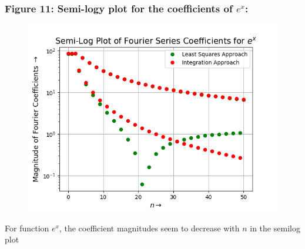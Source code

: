 \documentclass[12pt, a4paper]{article}
\begin{document}
\subsubsection{Figure 11: Semi-logy plot for the coefficients of $e^{x}$:}
\vspace*{-0.5cm}
\begin{figure}[H]
        \centering
        \includegraphics[scale = 0.75]{Figure_11.png}
        \label{fig:sample}
    \end{figure}
\vspace*{-0.5cm}
    \begin{center}
        For function $e^{x}$, the coefficient magnitudes seem to decrease with $n$ in the semilog plot
    \end{center}
\end{document}

